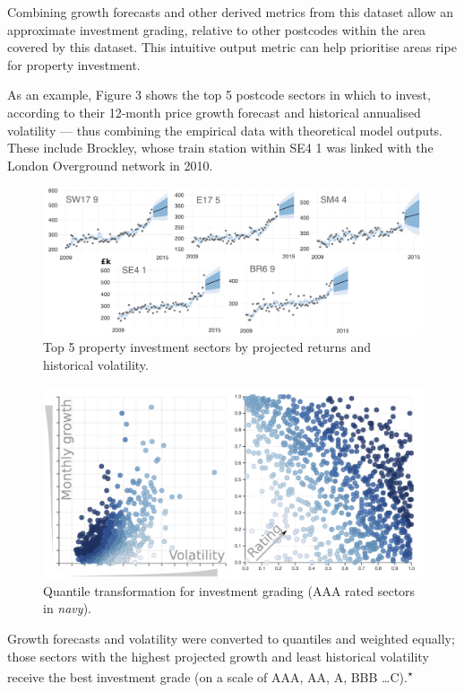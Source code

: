 \documentclass[
10pt, %
a4paper, %
oneside, %
headinclude,footinclude, %
BCOR5mm, %
]{scrartcl}
\begin{document}
Combining growth forecasts and other derived metrics from this
dataset allow an approximate investment grading, relative to other
postcodes within the area covered by this dataset. This intuitive
output metric can help prioritise areas ripe for property investment.

As an example, Figure 3 shows the top 5 postcode sectors
in which to invest, according to their 12-month price growth forecast
and historical annualised volatility --- thus combining the empirical
data with theoretical model outputs. These include Brockley,
whose train station within SE4 1 was linked with the London Overground network in 2010.\\

\begin{figure}[h]
\begin{center}
\includegraphics[width=.9\textwidth]{Figures/t5.pdf}
\caption{Top 5 property investment sectors by projected returns and historical volatility.}
\end{center}
\end{figure}

\setlength{\intextsep}{0em}
\begin{figure}
\vspace{.5em}
\centering
\includegraphics[width=.44\textwidth]{inkscape/grading_2.png}
\vspace{-1em}
\caption{ Quantile transformation for investment grading
  (AAA rated sectors in \emph{navy}).}
\vspace{.5em}
\end{figure}

Growth forecasts and volatility were converted to quantiles and
weighted equally; those sectors with the highest projected growth
and least historical volatility receive the best investment grade
(on a scale of AAA, AA, A, BBB \ldots C).\textsuperscript{$\star$}
\end{document}
